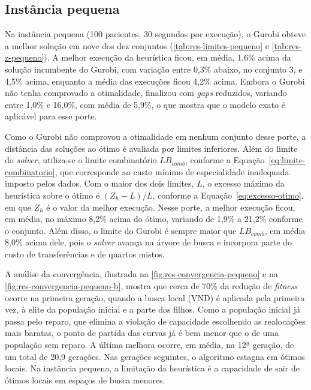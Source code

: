 \subsection{Instância pequena}
\label{sec:res-pequena}

Na instância pequena (100 pacientes, 30 segundos por execução), o Gurobi obteve a melhor solução em nove dos dez conjuntos (\autoref{tab:res-limites-pequeno} e \autoref{tab:res-z-pequeno}). A melhor execução da heurística ficou, em média, 1,6\% acima da solução incumbente do Gurobi, com variação entre 0,3\% abaixo, no conjunto 3, e 4,5\% acima, enquanto a média das execuções ficou 4,2\% acima. Embora o Gurobi não tenha comprovado a otimalidade, finalizou com \textit{gaps} reduzidos, variando entre 1,0\% e 16,0\%, com média de 5,9\%, o que mostra que o modelo exato é aplicável para esse porte.

Como o Gurobi não comprovou a otimalidade em nenhum conjunto desse porte, a distância das soluções ao ótimo é avaliada por limites inferiores. Além do limite do \textit{solver}, utiliza-se o limite combinatório $LB_{comb}$, conforme a Equação~\eqref{eq:limite-combinatorio}, que corresponde ao custo mínimo de especialidade inadequada imposto pelos dados. Com o maior dos dois limites, $L$, o excesso máximo da heurística sobre o ótimo é $(Z_h - L)/L$, conforme a Equação~\eqref{eq:excesso-otimo}, em que $Z_h$ é o valor da melhor execução. Nesse porte, a melhor execução ficou, em média, no máximo 8,2\% acima do ótimo, variando de 1,9\% a 21,2\% conforme o conjunto. Além disso, o limite do Gurobi é sempre maior que $LB_{comb}$, em média 8,0\% acima dele, pois o \textit{solver} avança na árvore de busca e incorpora parte do custo de transferências e de quartos mistos.

A análise da convergência, ilustrada na \autoref{fig:res-convergencia-pequeno} e na \autoref{fig:res-convergencia-pequeno-b}, mostra que cerca de 70\% da redução de \textit{fitness} ocorre na primeira geração, quando a busca local (VND) é aplicada pela primeira vez, à elite da população inicial e a parte dos filhos. Como a população inicial já passa pelo reparo, que elimina a violação de capacidade escolhendo as realocações mais baratas, o ponto de partida das curvas já é bem menor que o de uma população sem reparo. A última melhora ocorre, em média, na 12ª geração, de um total de 20,9 gerações. Nas gerações seguintes, o algoritmo estagna em ótimos locais. Na instância pequena, a limitação da heurística é a capacidade de sair de ótimos locais em espaços de busca menores.


